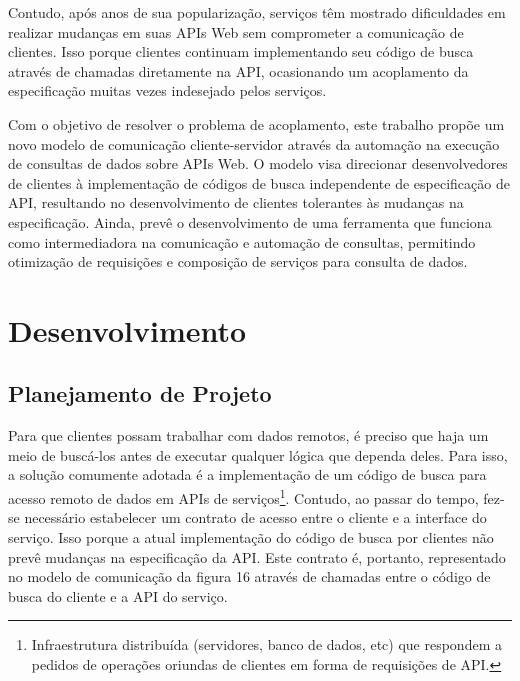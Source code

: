 \documentclass[12pt]{article}
\begin{document}
  Contudo, após anos de sua popularização, serviços têm mostrado dificuldades em realizar mudanças em suas APIs Web sem comprometer a comunicação de clientes. Isso porque clientes continuam implementando seu código de busca através de chamadas diretamente na API, ocasionando um acoplamento da especificação muitas vezes indesejado pelos serviços.
  
  Com o objetivo de resolver o problema de acoplamento, este trabalho propõe um novo modelo de comunicação cliente-servidor através da automação na execução de consultas de dados sobre APIs Web. O modelo visa direcionar desenvolvedores de clientes à implementação de códigos de busca independente de especificação de API, resultando no desenvolvimento de clientes tolerantes às mudanças na especificação. Ainda, prevê o desenvolvimento de uma ferramenta que funciona como intermediadora na comunicação e automação de consultas, permitindo otimização de requisições e composição de serviços para consulta de dados.
  
  \section{Desenvolvimento}

  \subsection{Planejamento de Projeto}

  Para que clientes possam trabalhar com dados remotos, é preciso que haja um meio de buscá-los antes de executar qualquer lógica que dependa deles. Para isso, a solução comumente adotada é a implementação de um código de busca para acesso remoto de dados em APIs de serviços\footnote{
    Infraestrutura distribuída (servidores, banco de dados, etc) que respondem a pedidos de operações oriundas de clientes em forma de requisições de API.
  }. Contudo, ao passar do tempo, fez-se necessário estabelecer um contrato de acesso entre o cliente e a interface do serviço. Isso porque a atual implementação do código de busca por clientes não prevê mudanças na especificação da API. Este contrato é, portanto, representado no modelo de comunicação da figura 16 através de chamadas entre o código de busca do cliente e a API do serviço.
\end{document}
